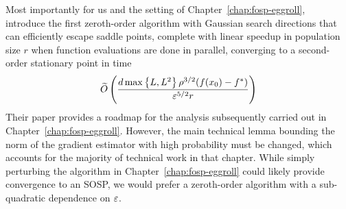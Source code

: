 Most importantly for us and the setting of Chapter~\ref{chap:fosp-eggroll},~\citet{ren2023escaping} introduce the first zeroth-order algorithm with Gaussian search directions that can efficiently escape saddle points, complete with linear speedup in population size $r$ when function evaluations are done in parallel, converging to a second-order stationary point in time
\begin{align*}
    \widetilde{O}\left(\frac{d \max \left\{L, L^2\right\} \rho^{3/2} (f(x_0)-f^*)}{\varepsilon^{5/2} r}\right)
\end{align*}
Their paper provides a roadmap for the analysis subsequently carried out in Chapter~\ref{chap:fosp-eggroll}. However, the main technical lemma bounding the norm of the gradient estimator with high probability must be changed, which accounts for the majority of technical work in that chapter. While simply perturbing the algorithm in Chapter~\ref{chap:fosp-eggroll} could likely provide convergence to an SOSP, we would prefer a zeroth-order algorithm with a sub-quadratic dependence on $\varepsilon$. 

